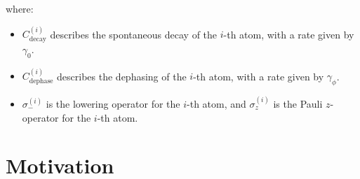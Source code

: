 where:
\begin{itemize}
	\item \( C_{\text{decay}}^{(i)} \) describes the spontaneous decay of the \(i\)-th atom, with a rate given by \(\gamma_0\).
	\item \( C_{\text{dephase}}^{(i)} \) describes the dephasing of the \(i\)-th atom, with a rate given by \(\gamma_\phi\).
	\item \( \sigma_-^{(i)} \) is the lowering operator for the \(i\)-th atom, and \( \sigma_z^{(i)} \) is the Pauli \( z \)-operator for the \(i\)-th atom.
\end{itemize}


\newpage











\section{Motivation}
\noindent

